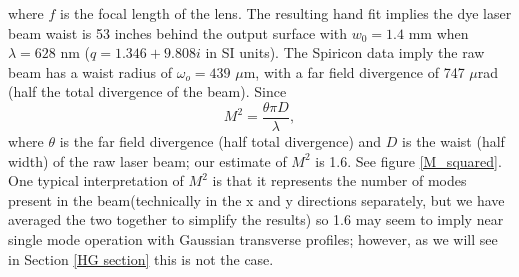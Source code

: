 where $f$ is the focal length of the lens. The resulting hand fit implies the dye laser beam waist is 53 inches behind the output surface with $w_0=1.4$ mm when $\lambda=628$ nm ($q=1.346+9.808i$ in SI units). The Spiricon data imply the raw beam has a waist radius of $\omega_o=439$ $\mu$m, with a far field divergence of 747 $\mu$rad (half the total divergence of the beam). Since \cite{Saleh:1991a}
\begin{equation}
M^2
=
\frac
{\theta\pi D}
{\lambda},
\end{equation}
where $\theta$ is the far field divergence (half total divergence) and $D$ is the waist (half width) of the raw laser beam; our estimate of $M^2$ is 1.6. See figure \ref{M_squared}. One typical interpretation of $M^2$ is that it represents the number of modes present in the beam(technically in the x and y directions separately, but we have averaged the two together to simplify the results) so 1.6 may seem to imply near single mode operation with Gaussian transverse profiles; however, as we will see in Section \ref{HG section} this is not the case.

